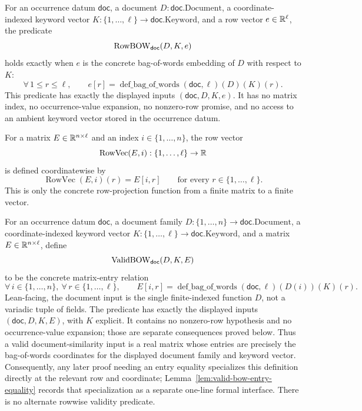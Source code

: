 \begin{definition}
  \label{def:document-row-bow-equality}
  For an occurrence datum $\mathsf{doc}$, a document
  $D:\mathsf{doc}.\mathrm{Document}$, a coordinate-indexed keyword vector
  $K:\{1,\ldots,\ell\}\to\mathsf{doc}.\mathrm{Keyword}$, and a row vector
  $e\in\mathbb{R}^\ell$, the predicate
  \[
    \operatorname{RowBOW}_{\mathsf{doc}}(D,K,e)
  \]
  holds exactly when $e$ is the concrete bag-of-words embedding of $D$ with
  respect to $K$:
  \[
    \forall\,1\leq r\leq\ell,\qquad
    e[r]=\operatorname{def\_bag\_of\_words}(\mathsf{doc},\ell)(D)(K)(r).
  \]
  This predicate has exactly the displayed inputs $(\mathsf{doc},D,K,e)$.  It
  has no matrix index, no occurrence-value expansion, no nonzero-row promise,
  and no access to an ambient keyword vector stored in the occurrence datum.
\end{definition}

\begin{definition}
  \label{def:matrix-row-vector}
  For a matrix $E\in\mathbb{R}^{n\times\ell}$ and an index $i\in\{1,\ldots,n\}$,
  the row vector
  \[
    \operatorname{RowVec}(E,i):\{1,\ldots,\ell\}\to\mathbb{R}
  \]
  is defined coordinatewise by
  \[
    \operatorname{RowVec}(E,i)(r)=E[i,r]
    \qquad\text{for every }r\in\{1,\ldots,\ell\}.
  \]
  This is only the concrete row-projection function from a finite matrix to a
  finite vector.
\end{definition}

\begin{definition}
  \label{def:valid-document-input-matrix}
  For an occurrence datum $\mathsf{doc}$, a document family
  $D:\{1,\ldots,n\}\to\mathsf{doc}.\mathrm{Document}$, a coordinate-indexed
  keyword vector $K:\{1,\ldots,\ell\}\to\mathsf{doc}.\mathrm{Keyword}$, and a
  matrix $E\in\mathbb{R}^{n\times \ell}$, define
  \[
    \operatorname{ValidBOW}_{\mathsf{doc}}(D,K,E)
  \]
  to be the concrete matrix-entry relation
  \[
    \forall\,i\in\{1,\ldots,n\},\ \forall\,r\in\{1,\ldots,\ell\},\qquad
    E[i,r]=
      \operatorname{def\_bag\_of\_words}(\mathsf{doc},\ell)(D(i))(K)(r).
  \]
  Lean-facing, the document input is the single finite-indexed function $D$,
  not a variadic tuple of fields.  The predicate has exactly the displayed
  inputs $(\mathsf{doc},D,K,E)$, with $K$ explicit.  It contains no nonzero-row
  hypothesis and no occurrence-value expansion; those are separate consequences
  proved below.  Thus a valid document-similarity input is a real matrix whose
  entries are precisely the bag-of-words coordinates for the displayed document
  family and keyword vector.  Consequently, any later proof needing an entry
  equality specializes this definition directly at the relevant row and
  coordinate; Lemma~\ref{lem:valid-bow-entry-equality} records that
  specialization as a separate one-line formal interface.  There is no
  alternate rowwise validity predicate.
\end{definition}

